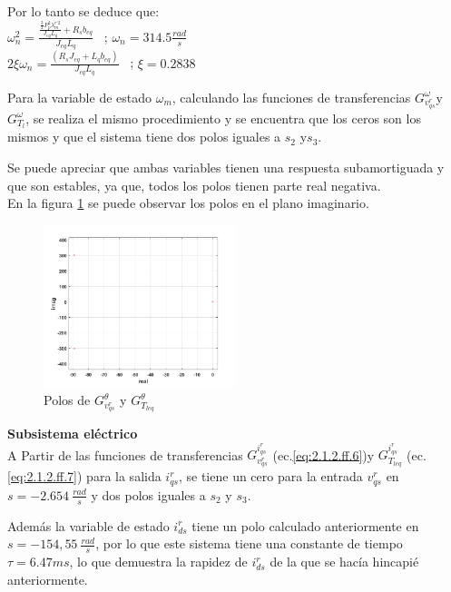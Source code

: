 \documentclass[10pt]{article}
\begin{document}
\begin{itemize}
Por lo tanto se deduce que:\\
$\omega_{n}^2 =\frac{\frac{ \frac{3}{2}P_{p}^{2}\lambda ^{r'2}_{m}}{J_{eq}L_{q}}+R_{s}b_{eq}}{J_{eq}L_{q}}$ \ ; $\omega_{n}=314.5 \frac{rad}{s}$\\
$2\xi \omega_{n}=\frac{(R_{s}J_{eq}+L_{q}b_{eq})}{J_{eq}L_{q}}$ \ ; $\xi=0.2838$

Para la variable de estado $\omega_{m}$, calculando las funciones de transferencias $G^{\omega}_{v^{r}_{qs}}$y $G^{\omega}_{T_{l}}$, se realiza el mismo procedimiento y se encuentra que los ceros son los mismos y que el sistema tiene dos polos iguales a $s_{2}$ y$s_{3}$.

Se puede apreciar que ambas variables tienen una respuesta subamortiguada y que son estables, ya que, todos los polos tienen parte real negativa.\\
En la figura \ref{fig:polos} se puede observar los polos en el plano imaginario.

	\begin{figure}[h!]
	\centering
	\includegraphics[width=0.5\textwidth]{polos.png}
	\caption{\label{fig:polos}  Polos de $G^{\theta}_{v^{r}_{qs}}$ y $G^{\theta}_{T_{leq}}$}
	\end{figure}

	\vspace{0.2cm}
\subitem \textbf{Subsistema eléctrico}\vspace{0.2cm} \\
A Partir de las funciones de transferencias $G^{i^{r}_{qs}}_{v^{r}_{qs}}$ (ec.\ref{eq:2.1.2.ff.6})y $G^{i^{r}_{qs}}_{T_{leq}}$ (ec.\ref{eq:2.1.2.ff.7}) para la salida $i^{r}_{qs}$, se tiene un cero para la entrada $v^{r}_{qs}$ en $s=-2.654\ \frac{rad}{s}$ y dos polos iguales a $s_{2}$ y $s_{3}$.

Además la variable de estado $i^{r}_{ds}$ tiene un polo calculado anteriormente en $s=-154,55\ \frac{rad}{s}$, por lo que este sistema tiene una constante de tiempo $\tau=6.47 ms$, lo que demuestra la rapidez de $i^{r}_{ds}$ de la que se hacía hincapié anteriormente.


\end{itemize}
\end{document}
